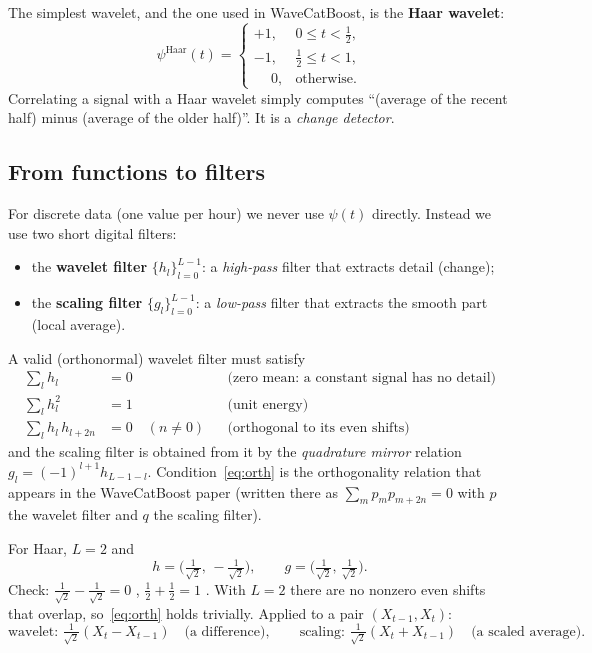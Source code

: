 \documentclass[11pt,a4paper]{article}
\begin{document}
The simplest wavelet, and the one used in WaveCatBoost, is the \textbf{Haar wavelet}:
\[
  \psi^{\text{Haar}}(t) =
  \begin{cases}
    +1, & 0 \le t < \tfrac12,\\
    -1, & \tfrac12 \le t < 1,\\
    \phantom{+}0, & \text{otherwise.}
  \end{cases}
\]
Correlating a signal with a Haar wavelet simply computes ``(average of the recent half) minus (average of the
older half)''. It is a \emph{change detector}.

\subsection{From functions to filters}

For discrete data (one value per hour) we never use $\psi(t)$ directly. Instead we use two short
digital filters:

\begin{itemize}[leftmargin=1.5em]
  \item the \textbf{wavelet filter} $\{h_l\}_{l=0}^{L-1}$: a \emph{high-pass} filter that extracts detail (change);
  \item the \textbf{scaling filter} $\{g_l\}_{l=0}^{L-1}$: a \emph{low-pass} filter that extracts the smooth part (local average).
\end{itemize}

A valid (orthonormal) wavelet filter must satisfy
\begin{align}
  \sum_{l} h_l &= 0 && \text{(zero mean: a constant signal has no detail)} \label{eq:zero}\\
  \sum_{l} h_l^2 &= 1 && \text{(unit energy)} \label{eq:unit}\\
  \sum_{l} h_l\,h_{l+2n} &= 0 \quad (n\neq 0) && \text{(orthogonal to its even shifts)} \label{eq:orth}
\end{align}
and the scaling filter is obtained from it by the \emph{quadrature mirror} relation
$g_l = (-1)^{l+1}h_{L-1-l}$. Condition~\eqref{eq:orth} is the orthogonality relation that appears in the
WaveCatBoost paper (written there as $\sum_m p_m p_{m+2n}=0$ with $p$ the wavelet filter and $q$ the scaling filter).

\begin{examplebox}
For Haar, $L=2$ and
\[
  h = \Big(\tfrac{1}{\sqrt2},\,-\tfrac{1}{\sqrt2}\Big), \qquad g = \Big(\tfrac{1}{\sqrt2},\,\tfrac{1}{\sqrt2}\Big).
\]
Check: $\tfrac{1}{\sqrt2}-\tfrac{1}{\sqrt2}=0$ \checkmark, \;
$\tfrac12+\tfrac12=1$ \checkmark. With $L=2$ there are no nonzero even shifts that overlap, so~\eqref{eq:orth} holds trivially.
Applied to a pair $(X_{t-1},X_t)$:
\[
  \text{wavelet: }\tfrac{1}{\sqrt2}(X_t - X_{t-1}) \quad\text{(a difference)},\qquad
  \text{scaling: }\tfrac{1}{\sqrt2}(X_t + X_{t-1}) \quad\text{(a scaled average)}.
\]
\end{examplebox}
\end{document}
